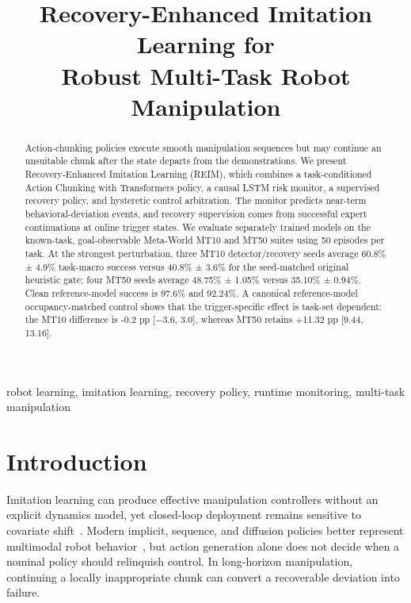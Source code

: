 \documentclass[conference]{IEEEtran}
\title{Recovery-Enhanced Imitation Learning for\\
Robust Multi-Task Robot Manipulation}
\author{
\IEEEauthorblockN{Junkai Zhang}
\IEEEauthorblockA{University of Wisconsin--Madison \quad \texttt{jzhang3257@wisc.edu}}
}
\begin{document}
\maketitle

\begin{abstract}
Action-chunking policies execute smooth manipulation sequences but may continue an unsuitable chunk after the state departs from the demonstrations. We present Recovery-Enhanced Imitation Learning (REIM), which combines a task-conditioned Action Chunking with Transformers policy, a causal LSTM risk monitor, a supervised recovery policy, and hysteretic control arbitration. The monitor predicts near-term behavioral-deviation events, and recovery supervision comes from successful expert continuations at online trigger states. We evaluate separately trained models on the known-task, goal-observable Meta-World MT10 and MT50 suites using 50 episodes per task. At the strongest perturbation, three MT10 detector/recovery seeds average 60.8\% ± 4.9\% task-macro success versus 40.8\% ± 3.6\% for the seed-matched original heuristic gate; four MT50 seeds average 48.75\% ± 1.05\% versus 35.10\% ± 0.94\%. Clean reference-model success is 97.6\% and 92.24\%. A canonical reference-model occupancy-matched control shows that the trigger-specific effect is task-set dependent: the MT10 difference is -0.2 pp [−3.6, 3.0], whereas MT50 retains +11.32 pp [9.44, 13.16].
\end{abstract}

\begin{IEEEkeywords}
robot learning, imitation learning, recovery policy, runtime monitoring, multi-task manipulation
\end{IEEEkeywords}

\section{Introduction}
\label{sec:introduction}

Imitation learning can produce effective manipulation controllers without an explicit dynamics model, yet closed-loop deployment remains sensitive to covariate shift~\cite{ross2011dagger,laskey2017dart,mandlekar2022robomimic}. Modern implicit, sequence, and diffusion policies better represent multimodal robot behavior~\cite{florence2022ibc,shafiullah2022bet,chi2023diffusion,zhao2023act}, but action generation alone does not decide when a nominal policy should relinquish control. In long-horizon manipulation, continuing a locally inappropriate chunk can convert a recoverable deviation into failure.
\end{document}

